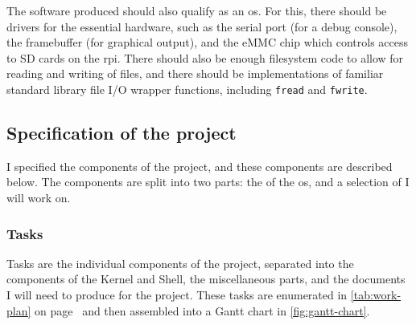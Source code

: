 \documentclass{article}
\begin{document}
The software produced should also qualify as an \gls{os}. For this, there
should be drivers for the essential hardware, such as the serial port (for a
debug console), the framebuffer (for graphical output), and the eMMC chip which
controls access to SD cards on the \gls{rpi}. There should also be enough
filesystem code to allow for reading and writing of files, and there should be
implementations of familiar standard library file I/O wrapper functions,
including \texttt{fread} and \texttt{fwrite}.


\subsection{Specification of the project}
I specified the components of the project, and these components are described
below. The components are split into two parts: the  of the
\gls{os}, and a selection of  I will work on.

\subsubsection{Tasks}
\label{sec:tasks}
Tasks are the individual components of the project, separated into the
components of the Kernel and Shell, the miscellaneous parts, and the documents
I will need to produce for the project. These tasks are enumerated in
\autoref{tab:work-plan} on page~\pageref*{tab:work-plan} and
then assembled into a Gantt chart in \autoref{fig:gantt-chart}.
\end{document}
